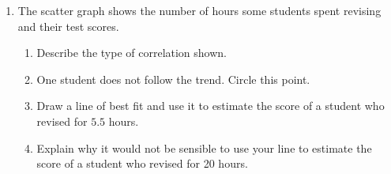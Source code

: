 \documentclass[12pt,a4paper]{article}
\begin{document}
\begin{enumerate}
    \begin{enumerate}
        \item Write down the modal class.
        \vspace{1cm}
        \item Calculate an estimate of the mean time.
        \vspace{2.5cm}
        \item Explain why your answer to (b) is only an estimate.
        \vspace{1.5cm}
    \end{enumerate}

    \item The scatter graph shows the number of hours some students spent revising and their test scores.

    \begin{center}
    \end{center}

    \begin{enumerate}
        \item Describe the type of correlation shown.
        \vspace{1cm}
        \item One student does not follow the trend. Circle this point.
        \vspace{0.5cm}
        \item Draw a line of best fit and use it to estimate the score of a student who revised for $5.5$ hours.
        \vspace{1.5cm}
        \item Explain why it would not be sensible to use your line to estimate the score of a student who revised for 20 hours.
        \vspace{1.5cm}
    \end{enumerate}


\end{enumerate}
\end{document}
